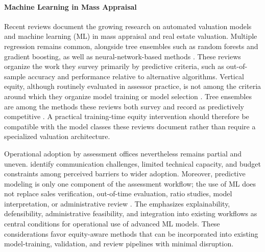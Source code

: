 \documentclass[10pt]{article}
\theoremstyle{definition}
\newcommand{\1}{\mathbf{1}}
\begin{document}
\paragraph{Machine Learning in Mass Appraisal}
Recent reviews document the {growing research on} automated valuation models and machine learning (ML) in mass appraisal and {real estate} valuation. {Multiple regression remains common, alongside tree ensembles such as random forests and gradient boosting, as well as neural-network-based methods} \cite{WangLi2019,Rootetal2023,Zilli2024,purdueAssessingTechniques}. These reviews organize the work they survey primarily by predictive criteria, such as out-of-sample accuracy and performance relative to alternative algorithms. Vertical equity, although routinely evaluated in assessor practice, is not among the criteria around which they organize model training or model selection \cite{WangLi2019,Rootetal2023,Zilli2024}. Tree ensembles are among the methods these reviews both survey and record as predictively competitive \cite{Rootetal2023,Sevgen2024100111,Zilli2024}. A practical training-time equity intervention should therefore be compatible with the model classes these reviews document rather than require a specialized valuation architecture.

 {Operational adoption by assessment offices nevertheless remains partial and uneven.} \textcite{BidansetRakow2022} identify {communication challenges, limited technical capacity, and budget constraints among perceived barriers to wider adoption}. {Moreover, predictive modeling is only one component of the assessment workflow; the use of ML does not replace sales verification, out-of-time evaluation, ratio studies, model interpretation, or administrative review} \cite{IAAO2020SalesVerification,IAAOAITaskForce2022}. {The} \textcite{IAAOAITaskForce2022} emphasizes explainability, defensibility, administrative feasibility, and integration into existing workflows as central conditions for operational use of advanced ML models. {These considerations favor equity-aware methods that can be incorporated into existing model-training, validation, and review pipelines with minimal disruption.}
\end{document}
